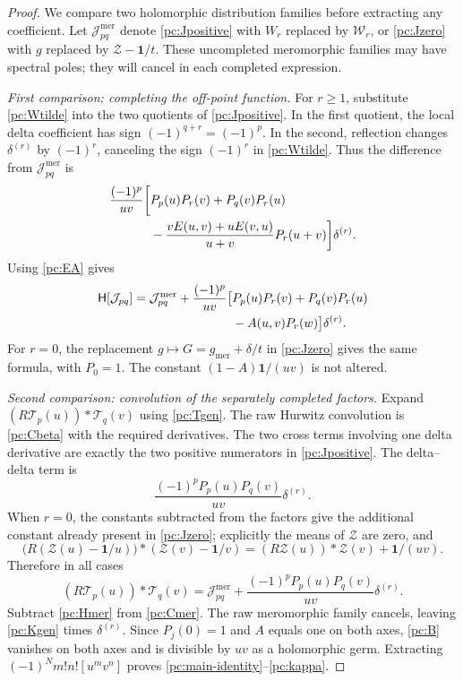 \documentclass[11pt,a4paper]{article}
\numberwithin{equation}{section}
\theoremstyle{definition}
\newcommand{\HH}{\mathsf H}
\newcommand{\CZ}{\mathscr Z}
\newcommand{\TG}{\mathcal T}
\newcommand{\CJ}{\mathcal J}
\newcommand{\one}{\mathbf 1}
\begin{document}
\begin{proof}
We compare two holomorphic distribution families before extracting any coefficient. Let $\CJ^{\mathrm{mer}}_{pq}$ denote \eqref{pc:Jpositive} with $W_r$ replaced by $\mathscr W_r$, or \eqref{pc:Jzero} with $g$ replaced by $\CZ-\one/t$. These uncompleted meromorphic families may have spectral poles; they will cancel in each completed expression.

\emph{First comparison: completing the off-point function.}
For $r\ge1$, substitute \eqref{pc:Wtilde} into the two quotients of \eqref{pc:Jpositive}. In the first quotient, the local delta coefficient has sign $(-1)^{q+r}=(-1)^p$. In the second, reflection changes $\delta^{(r)}$ by $(-1)^r$, canceling the sign $(-1)^r$ in \eqref{pc:Wtilde}. Thus the difference from $\CJ^{\mathrm{mer}}_{pq}$ is
\begin{align}
\frac{(-1)^p}{uv}\bigg[&P_p(u)P_r(v)+P_q(v)P_r(u)\notag\\
&-\frac{vE(u,v)+uE(v,u)}{u+v}P_r(u+v)\bigg]\delta^{(r)}.\label{pc:completion-raw}
\end{align}
Using \eqref{pc:EA} gives
\begin{align}
\HH[\CJ_{pq}]=\CJ^{\mathrm{mer}}_{pq}
+\frac{(-1)^p}{uv}\big[&P_p(u)P_r(v)+P_q(v)P_r(u)\notag\\
&-A(u,v)P_r(w)\big]\delta^{(r)}.\label{pc:Hmer}
\end{align}
For $r=0$, the replacement $g\mapsto G=g_{\mathrm{mer}}+\delta/t$ in \eqref{pc:Jzero} gives the same formula, with $P_0=1$. The constant $(1-A)\one/(uv)$ is not altered.

\emph{Second comparison: convolution of the separately completed factors.}
Expand $(R\TG_p(u))*\TG_q(v)$ using \eqref{pc:Tgen}. The raw Hurwitz convolution is \eqref{pc:Cbeta} with the required derivatives. The two cross terms involving one delta derivative are exactly the two positive numerators in \eqref{pc:Jpositive}. The delta--delta term is
\[
\frac{(-1)^pP_p(u)P_q(v)}{uv}\delta^{(r)}.
\]
When $r=0$, the constants subtracted from the factors give the additional constant already present in \eqref{pc:Jzero}; explicitly the means of $\CZ$ are zero, and
\[
\big(R(\CZ(u)-\one/u)\big)*(\CZ(v)-\one/v)
=(R\CZ(u))*\CZ(v)+\one/(uv).
\]
Therefore in all cases
\begin{equation}\label{pc:Cmer}
(R\TG_p(u))*\TG_q(v)=\CJ^{\mathrm{mer}}_{pq}
+\frac{(-1)^pP_p(u)P_q(v)}{uv}\delta^{(r)}.
\end{equation}
Subtract \eqref{pc:Hmer} from \eqref{pc:Cmer}. The raw meromorphic family cancels, leaving \eqref{pc:Kgen} times $\delta^{(r)}$. Since $P_j(0)=1$ and $A$ equals one on both axes, \eqref{pc:B} vanishes on both axes and is divisible by $uv$ as a holomorphic germ. Extracting $(-1)^Nm!n![u^mv^n]$ proves \eqref{pc:main-identity}--\eqref{pc:kappa}.


\end{proof}
\end{document}
